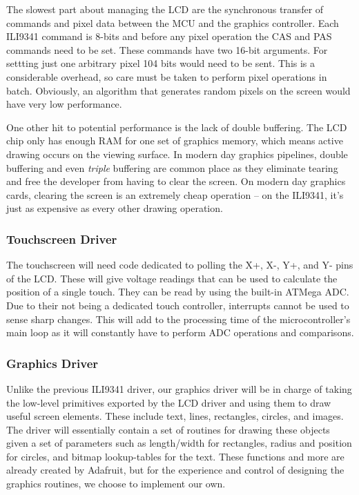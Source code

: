The slowest part about managing the LCD are the synchronous transfer of
commands and pixel data between the MCU and the graphics controller. Each
ILI9341 command is 8-bits and before any pixel operation the CAS and PAS
commands need to be set. These commands have two 16-bit arguments.
For settting just one arbitrary pixel 104 bits would need to be sent. This is a
considerable overhead, so care must be taken to perform pixel operations in
batch. Obviously, an algorithm that generates random pixels on the screen would have very
low performance.

One other hit to potential performance is the lack of double buffering. The LCD
chip only has enough RAM for one set of graphics memory, which means active
drawing occurs on the viewing surface. In modern day graphics pipelines, double
buffering and even \emph{triple} buffering are common place as they eliminate
tearing and free the developer from having to clear the screen. On modern day
graphics cards, clearing the screen is an extremely cheap operation -- on the
ILI9341, it's just as expensive as every other drawing operation.


\subsubsection{Touchscreen Driver}
The touchscreen will need code dedicated to polling the X+, X-, Y+, and Y- pins
of the LCD. These will give voltage readings that can be used to calculate the
position of a single touch. They can be read by using the built-in ATMega ADC.
Due to their not being a dedicated touch controller,
interrupts cannot be used to sense sharp changes. This will add to the
processing time of the microcontroller's main loop as it will constantly have
to perform ADC operations and comparisons.

\subsubsection{Graphics Driver}
Unlike the previous ILI9341 driver, our graphics driver will be in charge of
taking the low-level primitives exported by the LCD driver and using them to
draw useful screen elements. These include text, lines, rectangles, circles,
and images. The driver will essentially contain a set of routines for drawing
these objects given a set of parameters such as length/width for rectangles,
radius and position for circles, and bitmap lookup-tables for the text. These
functions and more are already created by Adafruit, but for the experience and
control of designing the graphics routines, we choose to implement our own.

